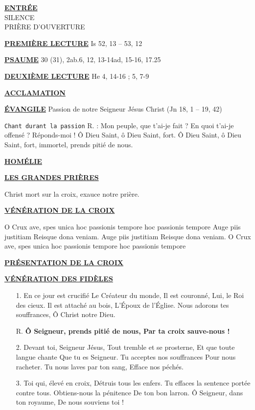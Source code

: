 \documentclass[11pt,a4paper]{article}
\newcommand{\SepRule}{\noindent							 %
						\begin{center}
							\rule{250pt}{1pt}
						\end{center}
						}
\newcommand{\NewsItem}[1]{%
\vspace{3pt}
\underline{\textbf{#1}}
		  }
\begin{document}





\begin{center}
\NewsItem{ENTRÉE} \\
SILENCE\\
PRIÈRE D'OUVERTURE
\end{center}

\NewsItem{PREMIÈRE LECTURE} Is 52, 13 – 53, 12

\begin{framed}
\NewsItem{PSAUME} 30 (31), 2ab.6, 12, 13-14ad, 15-16, 17.25

\end{framed}

\NewsItem{DEUXIÈME LECTURE} He 4, 14-16 ; 5, 7-9

\NewsItem{ACCLAMATION}
	
\begin{framed}
\NewsItem{ÉVANGILE} Passion de notre Seigneur Jésus Christ (Jn 18, 1 – 19, 42)

\texttt{Chant durant la passion}  R. : Mon peuple, que t'ai-je fait ? En quoi
t'ai-je offensé ? Réponds-moi ! Ô Dieu Saint, ô Dieu Saint, fort.
Ô Dieu Saint, ô Dieu Saint, fort, immortel, prends pitié de nous.
\end{framed}
\NewsItem{HOMÉLIE}

\NewsItem{LES GRANDES PRIÈRES}

Christ mort sur la croix, exauce notre prière.

\NewsItem{VÉNÉRATION DE LA CROIX} 
\begin{framed}
O Crux ave, spes unica hoc passionis tempore hoc passionis tempore
Auge piis justitiam Reisque dona veniam. Auge piis justitiam
Reisque dona veniam. O Crux ave, spes unica hoc passionis tempore hoc
passionis tempore
\end{framed}

\NewsItem{PRÉSENTATION DE LA CROIX} 

\NewsItem{VÉNÉRATION DES FIDÈLES}
\begin{framed}
\begin{itemize}
\item[1.] En ce jour est crucifié Le Créateur du monde,
Il est couronné, Lui, le Roi des cieux. Il est attaché au bois,
L’Époux de l’Église. Nous adorons tes souffrances, Ô Christ notre Dieu.
\item[R.] \textbf{Ô Seigneur, prends pitié de nous, Par ta croix sauve-nous !}
\item[2.] Devant toi, Seigneur Jésus, Tout tremble et se prosterne,
Et que toute langue chante Que tu es Seigneur. Tu acceptes nos souffrances
Pour nous racheter. Tu nous laves par ton sang, Efface nos péchés.
\item[3.] Toi qui, élevé en croix, Détruis tous les enfers. Tu effaces la sentence portée contre tous. Obtiens-nous la pénitence De ton bon larron.
Ô Seigneur, dans ton royaume, De nous souviens toi !
\end{itemize}
\end{framed}
\end{document}
